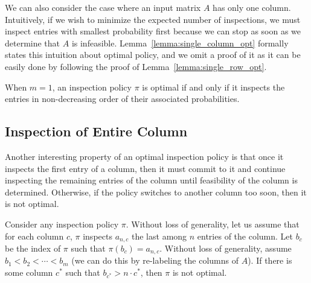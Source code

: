  We can also consider the case where an input matrix $A$ has only one column.
 Intuitively, if we wish to minimize the expected number of inspections, we must inspect entries with smallest probability first because we can stop as soon as we determine that $A$ is infeasible.
 Lemma~\ref{lemma:single_column_opt} formally states this intuition about optimal policy, and we omit a proof of it as it can be easily done by following the proof of Lemma~\ref{lemma:single_row_opt}.
 \begin{lemma} \label{lemma:single_column_opt}
 When $m = 1$, an inspection policy $\pi$ is optimal if and only if it inspects the entries in non-decreasing order of their associated probabilities.
 \end{lemma}


 \subsection{Inspection of Entire Column}
 Another interesting property of an optimal inspection policy is that once it inspects the first entry of a column, then it must commit to it and continue inspecting the remaining entries of the column until feasibility of the column is determined. Otherwise, if the policy switches to another column too soon, then it is not optimal. 
 \begin{theorem} \label{theorem:col_by_col_opt}
 Consider any inspection policy $\pi$.
 Without loss of generality, let us assume that for each column $c$, $\pi$ inspects $a_{n,c}$ the last among $n$ entries of the column. 
 Let $b_c$ be the index of $\pi$ such that $\pi(b_c) = a_{n,c}$. 
 Without loss of generality, assume $b_1 < b_2 < \cdots < b_m$ (we can do this by re-labeling the columns of $A$). 
 If there is some column $c^*$ such that $b_{c^*} > n\cdot c^*$, then $\pi$ is not optimal.
 \end{theorem}
